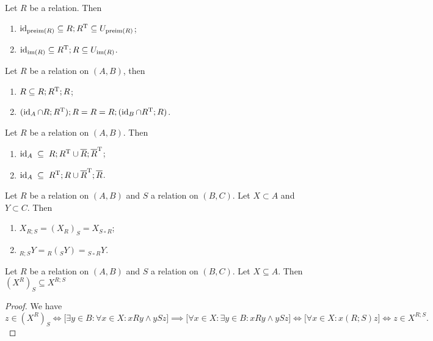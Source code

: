 \begin{lemma} \label{kernelInclusions}
Let $R$ be a relation. Then
\begin{enumerate}
\item $\operatorname{id}_{\operatorname{preim}(R)} \subseteq R;R^{\mathrm{T}} \subseteq U_{\operatorname{preim}(R)}$;
\item $\operatorname{id}_{\operatorname{im}(R)} \subseteq R^{\mathrm{T}};R \subseteq U_{\operatorname{im}(R)}$.
\end{enumerate}
\end{lemma}
\begin{corollary}
Let $R$ be a relation on $(A,B)$, then
\begin{enumerate}
\item $R \subseteq R;R^{\mathrm{T}};R$;
\item $(\operatorname{id}_A \cap R;R^{\mathrm{T}});R = R = R;(\operatorname{id}_{B}\cap R^{\mathrm{T}};R)$.
\end{enumerate}
\end{corollary}
\begin{corollary}
Let $R$ be a relation on $(A,B)$. Then
\begin{enumerate}
\item $\operatorname{id}_A \;\subseteq\; R;R^{\mathrm{T}} \cup \overline{R};\overline{R}^{\mathrm{T}}$;
\item $\operatorname{id}_A \;\subseteq\; R^{\mathrm{T}};R \cup \overline{R}^{\mathrm{T}};\overline{R}$.
\end{enumerate}
\end{corollary}

\begin{lemma}
Let $R$ be a relation on $(A, B)$ and $S$ a relation on $(B, C)$. Let $X\subset A$ and $Y\subset C$. Then
\begin{enumerate}
\item $X_{R;S} = (X_R)_S = X_{S\circ R}$;
\item $_{R;S}Y = {_R({_SY})} = {_{S\circ R}Y}$.
\end{enumerate}
\end{lemma}

\begin{lemma}
Let $R$ be a relation on $(A,B)$ and $S$ a relation on $(B,C)$. Let $X\subseteq A$. Then $(X^R)_S \subseteq X^{R;S}$
\end{lemma}
\begin{proof}
We have
\[ z\in (X^R)_S \iff \Big[\exists y\in B: \forall x\in X: xRy \land ySz\Big] \implies \Big[\forall x\in X:\exists y\in B: xRy \land ySz\Big] \iff \Big[\forall x\in X: x(R;S)z\Big] \iff z\in X^{R;S}. \] 
\end{proof}

